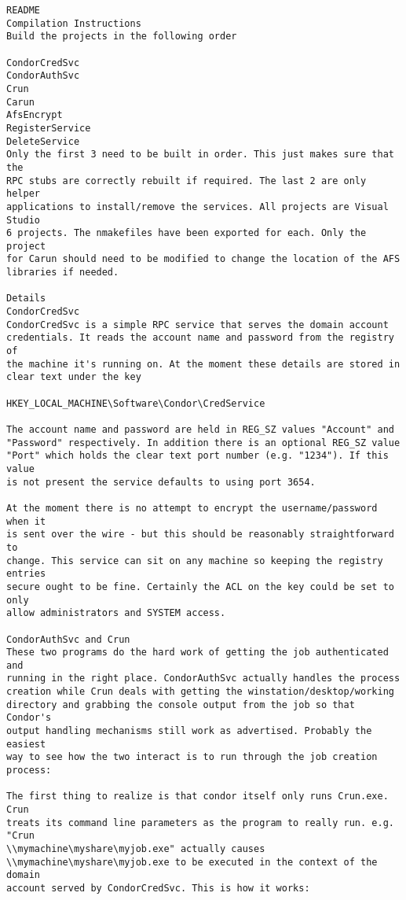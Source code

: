 \begin{verbatim}
README
Compilation Instructions
Build the projects in the following order

CondorCredSvc
CondorAuthSvc
Crun
Carun
AfsEncrypt
RegisterService
DeleteService
Only the first 3 need to be built in order. This just makes sure that the 
RPC stubs are correctly rebuilt if required. The last 2 are only helper 
applications to install/remove the services. All projects are Visual Studio 
6 projects. The nmakefiles have been exported for each. Only the project 
for Carun should need to be modified to change the location of the AFS 
libraries if needed.

Details
CondorCredSvc
CondorCredSvc is a simple RPC service that serves the domain account 
credentials. It reads the account name and password from the registry of 
the machine it's running on. At the moment these details are stored in 
clear text under the key

HKEY_LOCAL_MACHINE\Software\Condor\CredService

The account name and password are held in REG_SZ values "Account" and 
"Password" respectively. In addition there is an optional REG_SZ value 
"Port" which holds the clear text port number (e.g. "1234"). If this value 
is not present the service defaults to using port 3654.

At the moment there is no attempt to encrypt the username/password when it 
is sent over the wire - but this should be reasonably straightforward to 
change. This service can sit on any machine so keeping the registry entries 
secure ought to be fine. Certainly the ACL on the key could be set to only 
allow administrators and SYSTEM access.

CondorAuthSvc and Crun
These two programs do the hard work of getting the job authenticated and 
running in the right place. CondorAuthSvc actually handles the process 
creation while Crun deals with getting the winstation/desktop/working 
directory and grabbing the console output from the job so that Condor's 
output handling mechanisms still work as advertised. Probably the easiest 
way to see how the two interact is to run through the job creation process:

The first thing to realize is that condor itself only runs Crun.exe. Crun 
treats its command line parameters as the program to really run. e.g. "Crun 
\\mymachine\myshare\myjob.exe" actually causes 
\\mymachine\myshare\myjob.exe to be executed in the context of the domain 
account served by CondorCredSvc. This is how it works:


\end{verbatim}
